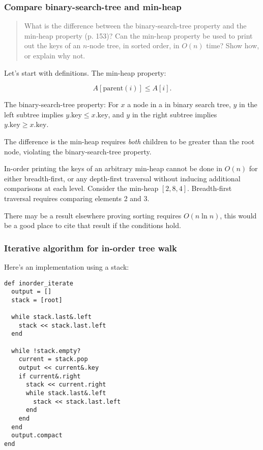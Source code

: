 \documentclass{article}
\begin{document}
\subsubsection{Compare binary-search-tree and min-heap}

\begin{quote}
  What is the difference between the binary-search-tree property and the min-heap
  property (p. 153)? Can the min-heap property be used to print out the keys of
  an $n$-node tree, in sorted order, in $O(n)$ time?  Show how, or explain why
  not.
\end{quote}

Let's start with definitions.
The min-heap property:

\begin{equation}
  A[\mathrm{parent}(i)] \leq A[i].
\end{equation}

The binary-search-tree property: For $x$ a node in a in binary search tree,
$y$ in the left subtree implies $y.\mathrm{key} \leq x.\mathrm{key}$, and
$y$ in the right subtree implies $y.\mathrm{key} \geq x.\mathrm{key}$.

The difference is the min-heap requires \emph{both} children to be
greater than the root node, violating the binary-search-tree property.

In-order printing the keys of an arbitrary min-heap cannot be done in $O(n)$
for either breadth-first, or any depth-first traversal without inducing
additional comparisons at each level. Consider the min-heap $[2, 8, 4]$.
Breadth-first traversal requires comparing elements 2 and 3.

There may be a result elsewhere proving sorting requires $O(n\ln n)$,
this would be a good place to cite that result if the conditions hold.

\subsubsection{Iterative algorithm for in-order tree walk}

Here's an implementation using a stack:

\begin{lstlisting}[frame=single,title=Iterative inorder traverse]
def inorder_iterate
  output = []
  stack = [root]

  while stack.last&.left
    stack << stack.last.left
  end

  while !stack.empty?
    current = stack.pop
    output << current&.key
    if current&.right
      stack << current.right
      while stack.last&.left
        stack << stack.last.left
      end
    end
  end
  output.compact
end
\end{lstlisting}
\end{document}
